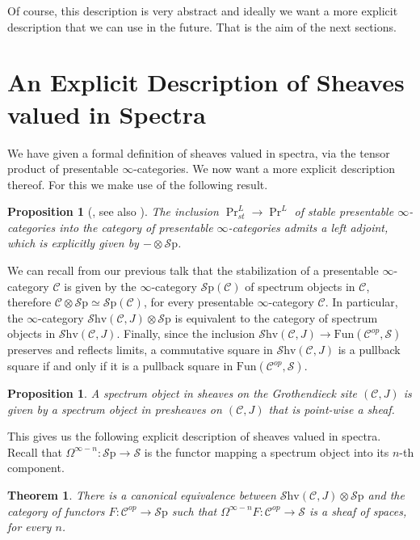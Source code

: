 \documentclass[10pt]{amsart}
\newcommand{\C}{\mathscr{C}}
\newcommand{\s}{\mathscr{S}}
\newcommand{\Sp}{\mathscr{S}\mathrm{p}}
\newcommand{\Fun}{\mathrm{Fun}}
\newcommand{\Shv}{\mathscr{S}\mathrm{hv}}
\newtheorem{theorem}[equation]{Theorem}
\newtheorem{proposition}[equation]{Proposition}
\theoremstyle{definition}
\theoremstyle{remark}
\numberwithin{equation}{section}
\begin{document}
Of course, this description is very abstract and ideally we want a more explicit description that we can use in the future. That is the aim of the next sections.

\section{An Explicit Description of Sheaves valued in Spectra}

We have given a formal definition of sheaves valued in spectra, via the tensor product of presentable $\infty$-categories. We now want a more explicit description thereof. For this we make use of the following result.

\begin{proposition}[{\cite{lurie2017ha}, see also \cite{gepnergrothnikolaus2015infiniteloopspacemachine}}]
 The inclusion $\Pr^L_{st} \to \Pr^L$ of stable presentable $\infty$-categories into the category of presentable $\infty$-categories admits a left adjoint, which is explicitly given by $-\otimes\Sp$.
\end{proposition}

We can recall from our previous talk that the stabilization of a presentable $\infty$-category $\C$ is given by the $\infty$-category $\Sp(\C)$ of spectrum objects in $\C$, therefore $\C\otimes\Sp  \simeq \Sp(\C)$, for every presentable $\infty$-category $\C$. In particular, the $\infty$-category $ \Shv(\C,J)\otimes \Sp$ is equivalent to the category of spectrum objects in $\Shv(\C,J)$. Finally, since the inclusion $\Shv(\C,J) \to \Fun(\C^{op},\s)$ preserves and reflects limits, a commutative square in $\Shv(\C,J)$ is a pullback square if and only if it is a pullback square in $\Fun(\C^{op},\s)$.

\begin{proposition}
  A spectrum object in sheaves on the Grothendieck site $(\C,J)$ is given by a spectrum object in presheaves on $(\C,J)$ that is point-wise a sheaf.
\end{proposition}

This gives us the following explicit description of sheaves valued in spectra. Recall that $\Omega^{\infty-n}\colon\Sp\to\s$ is the functor mapping a spectrum object into its $n$-th component.
\begin{theorem}
  There is a canonical equivalence between $\Shv(\C,J)\otimes\Sp$ and the category of functors $F\colon \C^{op} \to \Sp$ such that $\Omega^{\infty - n} F\colon \C^{op} \to \s$ is a sheaf of spaces, for every $n$.
\end{theorem}
\end{document}
